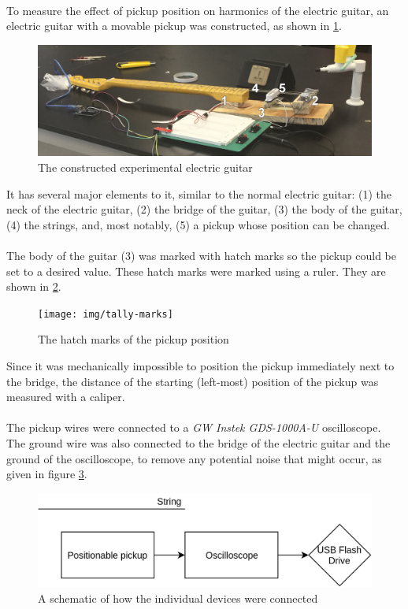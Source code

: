 \documentclass{article}
\begin{document}
\paragraph*{}
To measure the effect of pickup position on harmonics of the electric guitar, 
an electric guitar with a movable pickup was constructed, as shown in 
\ref{fig:custom-guitar}.
\begin{figure}[ht]
	\centering
	\includegraphics[width=.8\textwidth]{img/constructed-guitar}
	\caption{The constructed experimental electric guitar}
	\label{fig:custom-guitar}
\end{figure}
It has several major elements to it, similar to the normal electric guitar: 
(1) the neck of the electric guitar, (2) the bridge of the guitar, (3) the 
body of the guitar, (4) the strings, and, most notably, (5) a pickup whose 
position can be changed.

\paragraph*{}
The body of the guitar (3) was marked with hatch marks so the pickup could be 
set to a desired value. These hatch marks were marked using a ruler. They are 
shown in \ref{fig:hatch-marks}.
\begin{figure}[ht]
	\centering
	\texttt{[image: img/tally-marks]}
	\caption{The hatch marks of the pickup position}
	\label{fig:hatch-marks}
\end{figure}
Since it was mechanically impossible to position the pickup immediately next 
to the bridge, the distance of the starting (left-most) position of the pickup 
was measured with a caliper.

\paragraph*{}
The pickup wires were connected to a \textit{GW Instek GDS-1000A-U} 
oscilloscope. The ground wire was also connected to the bridge of the electric 
guitar and the ground of the oscilloscope, to remove any potential noise that 
might occur, as given in figure \ref{fig:connection-schematic}.
\begin{figure}[ht]
	\centering
	\includegraphics[width=.5\textwidth]{img/connection-schematic}
	\caption{A schematic of how the individual devices were connected}
	\label{fig:connection-schematic}
\end{figure}
\end{document}

